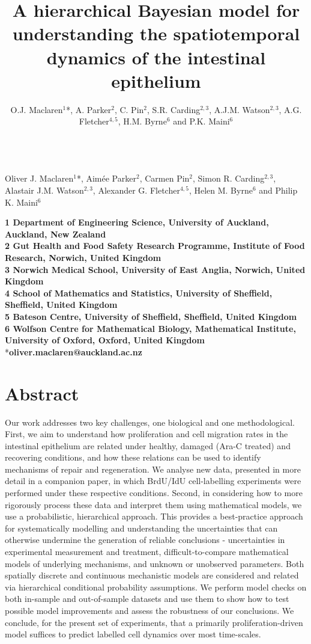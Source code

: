 \documentclass[10pt,letterpaper]{article}
\date{}
\title{A hierarchical Bayesian model for understanding the spatiotemporal
dynamics of the intestinal epithelium}
\author{O.J. Maclaren\(^1\)*, A. Parker\(^2\), C. Pin\(^2\), S.R.
Carding\(^{2,3}\), A.J.M. Watson\(^{2,3}\), A.G. Fletcher\(^{4,5}\),
H.M. Byrne\(^6\) and P.K. Maini\(^6\)}
\date{}
\begin{document}
\vspace*{0.35in}
\begin{flushleft}
{\Large
\textbf{}
}
\newline
\\
Oliver J. Maclaren\(^1\)*, Aim\'ee Parker\(^2\), Carmen Pin\(^2\), Simon R.
Carding\(^{2,3}\), Alastair J.M. Watson\(^{2,3}\), Alexander G. Fletcher\(^{4,5}\),
Helen M. Byrne\(^6\) and Philip K. Maini\(^6\)
\end{flushleft}


\textbf{1 Department of Engineering Science, University of Auckland,
Auckland, New Zealand}\\
\textbf{2 Gut Health and Food Safety Research Programme, Institute of
Food Research, Norwich, United Kingdom}\\
\textbf{3 Norwich Medical School, University of East Anglia, Norwich,
United Kingdom}\\
\textbf{4 School of Mathematics and Statistics, University of Sheffield,
Sheffield, United Kingdom}\\
\textbf{5 Bateson Centre, University of Sheffield, Sheffield, United
Kingdom}\\
\textbf{6 Wolfson Centre for Mathematical Biology, Mathematical
Institute, University of Oxford, Oxford, United Kingdom}\\
*\textbf{oliver.maclaren@auckland.ac.nz}

\section{Abstract}\label{abstract}

Our work addresses two key challenges, one biological and one
methodological. First, we aim to understand how proliferation and cell
migration rates in the intestinal epithelium are related under healthy,
damaged (Ara-C treated) and recovering conditions, and how these
relations can be used to identify mechanisms of repair and regeneration.
We analyse new data, presented in more detail in a companion paper, in
which BrdU/IdU cell-labelling experiments were performed under these
respective conditions. Second, in considering how to more rigorously
process these data and interpret them using mathematical models, we use
a probabilistic, hierarchical approach. This provides a best-practice
approach for systematically modelling and understanding the
uncertainties that can otherwise undermine the generation of reliable
conclusions - uncertainties in experimental measurement and treatment,
difficult-to-compare mathematical models of underlying mechanisms, and
unknown or unobserved parameters. Both spatially discrete and continuous
mechanistic models are considered and related via hierarchical
conditional probability assumptions. We perform model checks on both
in-sample and out-of-sample datasets and use them to show how to test
possible model improvements and assess the robustness of our
conclusions. We conclude, for the present set of experiments, that a
primarily proliferation-driven model suffices to predict labelled cell
dynamics over most time-scales.
\end{document}
